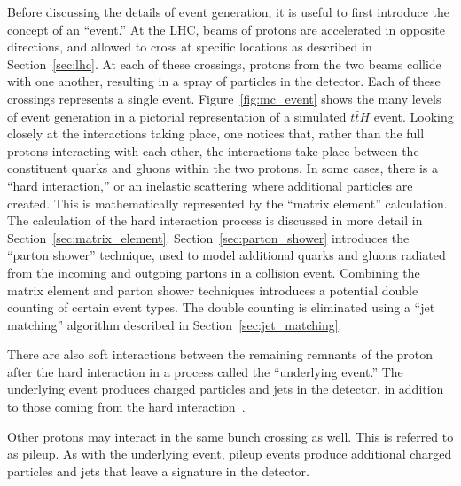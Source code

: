 Before discussing the details of event generation, it is useful to first
introduce the concept of an ``event.''
At the LHC, beams of protons are accelerated in opposite directions, and
allowed to cross at specific locations as described in Section~\ref{sec:lhc}.
At each of these crossings, protons from the two beams collide with one
another, resulting in a spray of particles in the detector.
Each of these crossings represents a single event.
Figure~\ref{fig:mc_event} shows the many levels of event generation in a
pictorial representation of a simulated $t\bar{t}H$ event.
Looking closely at the interactions taking place, one notices that,
rather than the full protons interacting with each other, the interactions
take place between the constituent quarks and gluons within the two protons.
In some cases, there is a ``hard interaction,'' or an inelastic scattering
where additional particles are created.
This is mathematically represented by the ``matrix element'' calculation.
The calculation of the hard interaction process is discussed in more detail
in Section~\ref{sec:matrix_element}.
Section~\ref{sec:parton_shower} introduces the ``parton shower'' technique,
used to model additional quarks and gluons radiated from the incoming and
outgoing partons in a collision event.
Combining the matrix element and parton shower techniques introduces a
potential double counting of certain event types.
The double counting is eliminated using a ``jet matching'' algorithm described
in Section~\ref{sec:jet_matching}.


There are also soft interactions between the remaining remnants of the proton
after the hard interaction in a process called the ``underlying event.''
The underlying event produces charged particles and jets in the detector, in
addition to those coming from the hard interaction~\cite{Field:2002vt}.

Other protons may interact in the same bunch crossing as well.
This is referred to as pileup.
As with the underlying event, pileup events produce additional charged
particles and jets that leave a signature in the detector.



